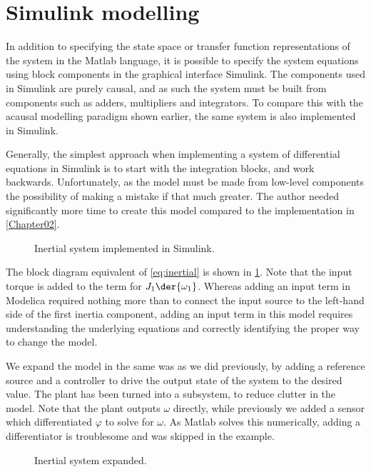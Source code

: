 \documentclass[\rootfolder/main.tex]{subfiles}
\begin{document}
\section{Simulink modelling}

In addition to specifying the state space or transfer function representations of the system in the Matlab language, it is possible to specify
the system equations using block components in the graphical interface Simulink.
The components used in Simulink are purely causal, and as such the system must be built from components such as adders, multipliers and integrators.
To compare this with the acausal modelling paradigm shown earlier, the same system is also implemented in Simulink.

Generally, the simplest approach when implementing a system of differential equations in Simulink is to start with the integration blocks, and work backwards.
Unfortunately, as the model must be made from low-level components the possibility of making a mistake if that much greater.
The author needed significantly more time to create this model compared to the implementation in \cref{Chapter02}.

\begin{figure}[ht]
    \caption{Inertial system implemented in Simulink.\label{fig:simulink-inertial}}
\end{figure}

The block diagram equivalent of \cref{eq:inertial} is shown in \cref{fig:simulink-inertial}.
Note that the input torque is added to the term for $J_{1} \der{\omega_{1}}$.
Whereas adding an input term in Modelica required nothing more than to connect the input source to the left-hand side of the first inertia component,
adding an input term in this model requires understanding the underlying equations and correctly identifying the proper way to change the model.

We expand the model in the same was as we did previously, by adding a reference source and a controller to drive the output state of the system to the desired value.
The plant has been turned into a subsystem, to reduce clutter in the model.
Note that the plant outputs $\omega$ directly, while previously we added a sensor which differentiated $\varphi$ to solve for $\omega$.
As Matlab solves this numerically, adding a differentiator is troublesome and was skipped in the example.

\begin{figure}[ht]
    \caption{Inertial system expanded.\label{fig:simulink-inertial-expanded}}
\end{figure}
\end{document}
